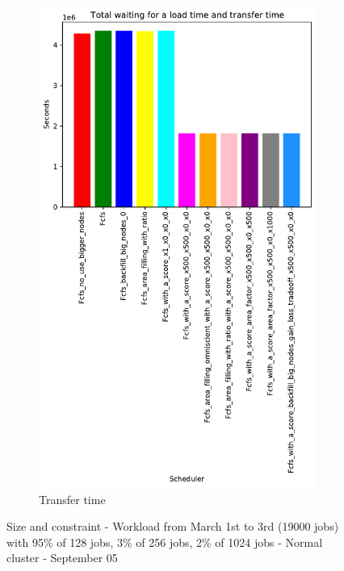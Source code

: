 \documentclass[a4paper]{article}
\begin{document}
\begin{figure}[H]
\begin{subfigure}[b]{0.4\linewidth}\centering\includegraphics[width=0.7\linewidth]{MBSS/plot/Results_Size_And_Data_2022-03-01->2022-03-03_V9532_Total_waiting_for_a_load_time_and_transfer_time_450_128_32_256_4_1024.pdf}\caption{Transfer time}\label{45}\end{subfigure}
\caption{Size and constraint - Workload from March 1st to 3rd (19000 jobs) with 95\% of 128 jobs, 3\% of 256 jobs, 2\% of 1024 jobs - Normal cluster - September 05}\label{49}\end{figure}
\end{document}
